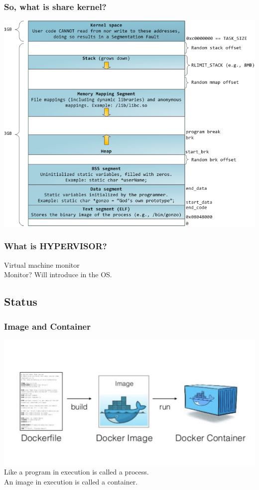 \documentclass{beamer}
\begin{document}
\begin{frame}
    \frametitle{So, what is share kernel?}
    \begin{center}
        \includegraphics[width=.7\textwidth]{32bit_mem_layout.png}
        \cite{32_mem_layout}
    \end{center}
\end{frame}

\hypertarget{HYPERVISOR}{}
\begin{frame}
    \frametitle{What is HYPERVISOR?}
    \begin{center}
        \Huge{Virtual machine monitor}\\
        \tiny{Monitor? Will introduce in the OS.}
    \end{center}
\end{frame}

\subsection{Status}
\begin{frame}
    \frametitle{Image and Container}
    \centering
    \includegraphics[width=.95\textwidth]{1_p8k1b2DZTQEW_yf0hYniXw.jpg}
    \cite{Build_an_image}\\
    Like a program in execution is called a process.\\
    An image in execution is called a container.
\end{frame}
\end{document}
